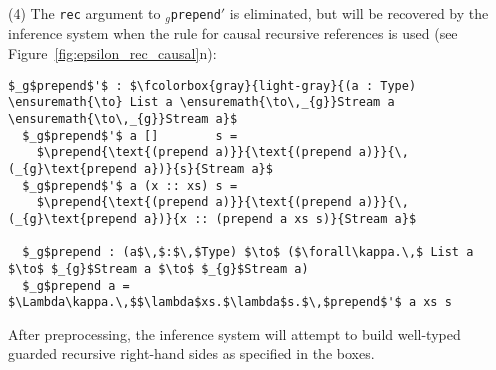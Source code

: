 (4) The \texttt{rec} argument to \texttt{$_g$prepend$'$} is eliminated, but will
be recovered by the inference system when the rule for causal recursive
references is used (see Figure~\ref{fig:epsilon_rec_causal}n):
\begin{lstlisting}[mathescape, title=\ttBlock]
  $_g$prepend$'$ : $\fcolorbox{gray}{light-gray}{(a : Type) \ensuremath{\to} List a \ensuremath{\to\,_{g}}Stream a \ensuremath{\to\,_{g}}Stream a}$
  $_g$prepend$'$ a []        s =
    $\prepend{\text{(prepend a)}}{\text{(prepend a)}}{\,(_{g}\text{prepend a})}{s}{Stream a}$
  $_g$prepend$'$ a (x :: xs) s =
    $\prepend{\text{(prepend a)}}{\text{(prepend a)}}{\,(_{g}\text{prepend a})}{x :: (prepend a xs s)}{Stream a}$

  $_g$prepend : (a$\,$:$\,$Type) $\to$ ($\forall\kappa.\,$ List a $\to$ $_{g}$Stream a $\to$ $_{g}$Stream a)
  $_g$prepend a = $\Lambda\kappa.\,$$\lambda$xs.$\lambda$s.$\,$prepend$'$ a xs s
\end{lstlisting}
After preprocessing, the inference system will attempt to build well-typed
guarded recursive right-hand sides as specified in the boxes.

\newcommand{\evens}[5]{\ensuremath{\boxed{IE\,\vdash\,\text{#4}\,:\,\text{#5}\,\infer
        \text{?}\,:\,\forall\kappa.\,_{g}\text{#5})}}}
\newcommand{\evensm}[5]{\ensuremath{\boxed{
            \begin{matrix*}[l] IE\,\vdash \\
                           \quad\text{#4}\,:\,\text{#5}\,\infer\,\text{?}\,:\,\forall\kappa.\,_{g}\text{#5})
            \end{matrix*}
            }}}

